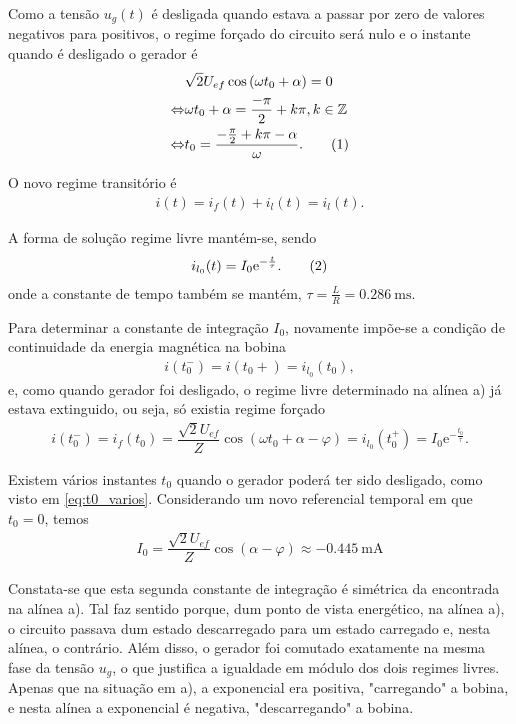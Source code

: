 \documentclass[a4paper, titlepage, portuguese]{article}
\newcommand{\eq}{\Leftrightarrow} %
\newcommand\numberthis{\addtocounter{equation}{1}\tag{\theequation}}
\newcommand\e{\mathrm{e} }
\begin{document}
	\subsubsection{}
	\par
	Como a tensão $u_g(t)$ é desligada quando estava a passar por zero de valores negativos para positivos, o regime forçado do circuito será nulo e o instante quando é desligado o gerador é
	\begin{align*}
		&\sqrt{2}U_{ef} \cos\left(\omega t_0 + \alpha\right) = 0 \\ \eq
		&\omega t_0 + \alpha = \dfrac{-\pi}{2} + k\pi, k \in \mathbb{Z} \\ \eq
		&t_0 = \dfrac{- \frac{\pi}{2} + k\pi - \alpha}{\omega}. \numberthis \label{eq:t0_varios}
	\end{align*}
	\par
	O novo regime transitório é
	\begin{align*}
		i(t) = i_f(t) + i_l(t) = i_l(t).
	\end{align*}
	\par
	A forma de solução regime livre mantém-se, sendo
	\begin{align*}
		i_{l_0}(t) = I_0 \e^{-\frac{t}{\tau}}. \numberthis \label{eq:trans_RL_2livre}
	\end{align*}
	onde a constante de tempo também se mantém, $\tau = \frac{L}{R} = \SI{0.286}{\milli\second}$.
	\par
	Para determinar a constante de integração $I_0$, novamente impõe-se a condição de continuidade da energia magnética na bobina
	\begin{align*}
		i(t_0^-) = i(t_0+) = i_{l_0}(t_0),
	\end{align*}
	e, como quando gerador foi desligado, o regime livre determinado na alínea a) já estava extinguido, ou seja, só existia regime forçado
	\begin{align*}
		i(t_0^-) = i_f(t_0) = \dfrac{\sqrt{2}U_{ef}}{Z} \cos\left(\omega t_0 + \alpha - \varphi\right) = i_{l_0}(t_0^+) = I_0 \e^{-\frac{t_0}{\tau}}.
	\end{align*}
	\par
	Existem vários instantes $t_0$ quando o gerador poderá ter sido desligado, como visto em \eqref{eq:t0_varios}. Considerando um novo referencial temporal em que $t_0 = 0$, temos
	\begin{align*}
		I_0 = \dfrac{\sqrt{2}U_{ef}}{Z} \cos\left(\alpha - \varphi\right) \approx \SI{-0.445}{\milli\ampere}
	\end{align*}
	\par
	Constata-se que esta segunda constante de integração é simétrica da encontrada na alínea a). Tal faz sentido porque, dum ponto de vista energético, na alínea a), o circuito passava dum estado descarregado para um estado carregado e, nesta alínea, o contrário. Além disso, o gerador foi comutado exatamente na mesma fase da tensão $u_g$, o que justifica a igualdade em módulo dos dois regimes livres. Apenas que na situação em a), a exponencial era positiva, "carregando" a bobina, e nesta alínea a exponencial é negativa, "descarregando" a bobina.
\end{document}
